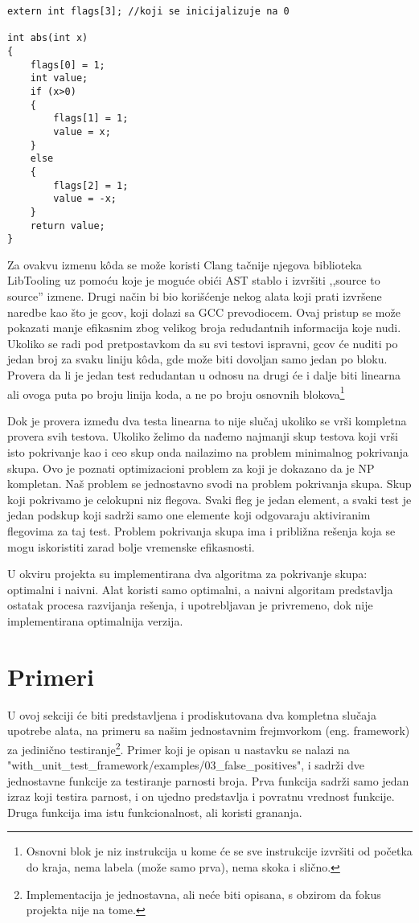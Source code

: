 \documentclass[a4paper]{article}
\begin{document}
\begin{lstlisting}
extern int flags[3]; //koji se inicijalizuje na 0

int abs(int x)
{
	flags[0] = 1;
	int value;
	if (x>0)
	{
		flags[1] = 1;
		value = x;
	}
	else
	{
		flags[2] = 1;
		value = -x;
	}
	return value;
}
\end{lstlisting}

Za ovakvu izmenu kôda se može koristi Clang tačnije njegova biblioteka LibTooling uz pomoću koje je moguće obići AST stablo i izvršiti ,,source to source'' izmene. Drugi način bi bio korišćenje nekog alata koji prati izvršene naredbe kao što je gcov, koji dolazi sa GCC prevodiocem. Ovaj pristup se može pokazati manje efikasnim zbog velikog broja redudantnih informacija koje nudi. Ukoliko se radi pod pretpostavkom da su svi testovi ispravni, gcov će nuditi po jedan broj za svaku liniju kôda, gde može biti dovoljan samo jedan po bloku. Provera da li je jedan test redudantan u odnosu na drugi će i dalje biti linearna ali ovoga puta po broju linija koda, a ne po broju osnovnih blokova\footnote{Osnovni blok je niz instrukcija u kome će se sve instrukcije izvršiti od početka do kraja, nema labela (može samo prva), nema skoka i slično.} 

Dok je provera između dva testa linearna to nije slučaj ukoliko se vrši kompletna provera svih testova. Ukoliko želimo da nađemo najmanji skup testova koji vrši isto pokrivanje kao i ceo skup onda nailazimo na problem minimalnog pokrivanja skupa. Ovo je poznati optimizacioni problem za koji je dokazano da je NP kompletan. Naš problem se jednostavno svodi na problem pokrivanja skupa. Skup koji pokrivamo je celokupni niz flegova. Svaki fleg je jedan element, a svaki test je jedan podskup koji sadrži samo one elemente koji odgovaraju aktiviranim flegovima za taj test. Problem pokrivanja skupa ima i približna rešenja koja se mogu iskoristiti zarad bolje vremenske efikasnosti. 

U okviru projekta su implementirana dva algoritma za pokrivanje skupa: optimalni i naivni. Alat koristi samo optimalni, a naivni algoritam predstavlja ostatak procesa razvijanja rešenja, i upotrebljavan je privremeno, dok nije implementirana optimalnija verzija.

\section{Primeri}
\label{sec:examples}
U ovoj sekciji će biti predstavljena i prodiskutovana dva kompletna slučaja upotrebe alata, na primeru sa našim jednostavnim frejmvorkom (eng. framework) za jedinično testiranje\footnote{Implementacija je jednostavna, ali neće biti opisana, s obzirom da fokus projekta nije na tome.}. Primer koji je opisan u nastavku se nalazi na "with\_unit\_test\_framework/examples/03\_false\_positives", i sadrži dve jednostavne funkcije za testiranje parnosti broja. Prva funkcija sadrži samo jedan izraz koji testira parnost, i on ujedno predstavlja i povratnu vrednost funkcije. Druga funkcija ima istu funkcionalnost, ali koristi grananja.
\end{document}
